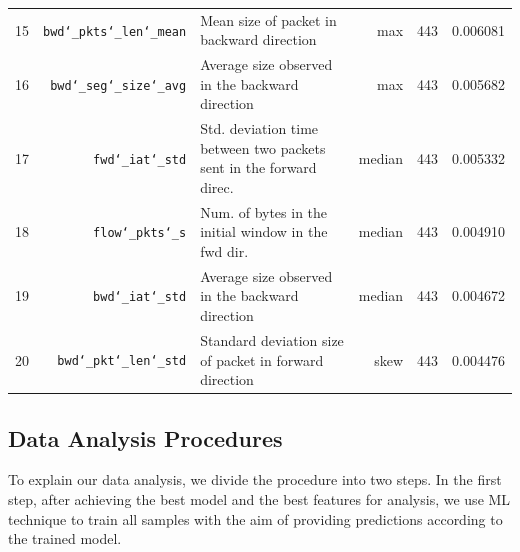 \begin{table}[ht]
\begin{small}
\begin{tabular}{rrlrrr}
	15 & \texttt{bwd\char`_pkts\char`_len\char`_mean} & Mean size of packet in backward direction & max  & 443&0.006081\\ 
	16 & \texttt{bwd\char`_seg\char`_size\char`_avg} & Average size observed in the backward direction & max  & 443&0.005682\\ 
	17 & \texttt{fwd\char`_iat\char`_std} & Std. deviation time between two packets sent in the forward direc. & median  & 443 &0.005332\\ 
	18 & \texttt{flow\char`_pkts\char`_s} & Num. of bytes in the initial window in the fwd dir. &  median  & 443&0.004910\\ 
	19 & \texttt{bwd\char`_iat\char`_std} & Average size observed in the backward direction & median  & 443&0.004672\\ 
	20 & \texttt{bwd\char`_pkt\char`_len\char`_std} & Standard deviation size of packet in forward direction & skew  & 443&0.004476\\
   \hline

 \end{tabular}
 \end{small}
 \label{tab:features}
 \end{table}


\subsection{Data Analysis Procedures}\label{sec:learning}



To explain our data analysis, we divide the procedure into two steps. In the first step, after achieving the best model and the best
features for analysis, we use ML technique to train all samples with the aim of providing predictions according to the trained model.

